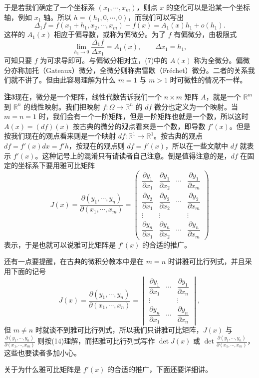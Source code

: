 于是若我们确定了一个坐标系 $(x_1,\cdots,x_m)$，则点 $x$ 的变化可以是沿某一个坐标轴，例如 $x_1$ 轴。所以 $h=(h_1,0,\cdots,0)$，而我们可以写出
\begin{equation}
 \Delta_1 f=f(x_1+h_1,x_2,\cdots,x_m)-f(x)=A_1(x)h_1+o(h_1).
 \tag{13}
\end{equation}
这样的 $A_1(x)$ 相应于偏导数，或称为偏微分。为了 $f$ 有偏微分，由极限式
\[
 \lim_{h_1\to0}\frac{\Delta_1f}{\Delta x_1}=A_1(x),\qquad \Delta x_1=h_1,
\]
可知只要 $f$ 为可求导即可。与偏微分相对立，(7)中的 $A(x)$ 称为全微分。偏微分亦称加托（Gateaux）微分，全微分则称弗雷歇（Fréchet）微分。二者的关系我们就不讲了。但由此容易理解为什么 $m=1$ 与 $m>1$ 时可微性的情况不一样。

\noindent\textbf{注3}\quad 现在，微分是一个矩阵，线性代数告诉我们一个 $n\times m$ 矩阵 $A$，就是一个 $\mathbb R^m$ 到 $\mathbb R^n$ 的线性映射。我们把映射 $f:\Omega\to\mathbb R^n$ 的 $df$ 微分也定义为一个映射。当 $m=n=1$ 时，我们会有一个一阶矩阵，但是一阶矩阵也就是一个数，所以这时 $A(x)=(df)(x)$ 按古典的微分的观点看来是一个数，即导数 $f'(x)$。但是按我们现在的观点看来则是一个映射 $df:\mathbb R^1\to\mathbb R^1$。按古典的观点 $df=f'(x)dx=f'h$，按现在的观点则 $df=f'(x)$，所以在一些文献中 $df$ 就表示 $f'(x)$。这种记号上的混淆只有请读者自己注意。倒是值得注意的是，$df$ 在固定的坐标系下要用雅可比矩阵
\begin{equation}
 J(x)=\frac{\partial(y_1,\cdots,y_n)}{\partial(x_1,\cdots,x_m)}=
 \begin{pmatrix}
 \dfrac{\partial y_1}{\partial x_1}&\dfrac{\partial y_1}{\partial x_2}&\cdots&\dfrac{\partial y_1}{\partial x_m}\\
 \dfrac{\partial y_2}{\partial x_1}&\dfrac{\partial y_2}{\partial x_2}&\cdots&\dfrac{\partial y_2}{\partial x_m}\\
 \vdots&\vdots&&\vdots\\
 \dfrac{\partial y_n}{\partial x_1}&\dfrac{\partial y_n}{\partial x_2}&\cdots&\dfrac{\partial y_n}{\partial x_m}
 \end{pmatrix}
 \tag{14}
\end{equation}
表示，于是也就可以说雅可比矩阵是 $f'(x)$ 的合适的推广。

还有一点要提醒，在古典的微积分教本中是在 $m=n$ 时讲雅可比行列式，并且采用下面的记号
\begin{equation}
 J(x)=\frac{\partial(y_1,\cdots,y_n)}{\partial(x_1,\cdots,x_n)}=
 \begin{vmatrix}
 \dfrac{\partial y_1}{\partial x_1}&\cdots&\dfrac{\partial y_1}{\partial x_n}\\
 \vdots&&\vdots\\
 \dfrac{\partial y_n}{\partial x_1}&\cdots&\dfrac{\partial y_n}{\partial x_n}
 \end{vmatrix},
 \tag{15}
\end{equation}
但 $m\ne n$ 时就谈不到雅可比行列式，所以我们只讲雅可比矩阵，$J(x)$ 与 $\frac{\partial(y_1,\cdots,y_n)}{\partial(x_1,\cdots,x_m)}$ 则按(14)理解，而把雅可比行列式写作 $\det J(x)$ 或 $\det\frac{\partial(y_1,\cdots,y_n)}{\partial(x_1,\cdots,x_m)}$，这些也要读者多加小心。

关于为什么雅可比矩阵是 $f'(x)$ 的合适的推广，下面还要详细讲。
